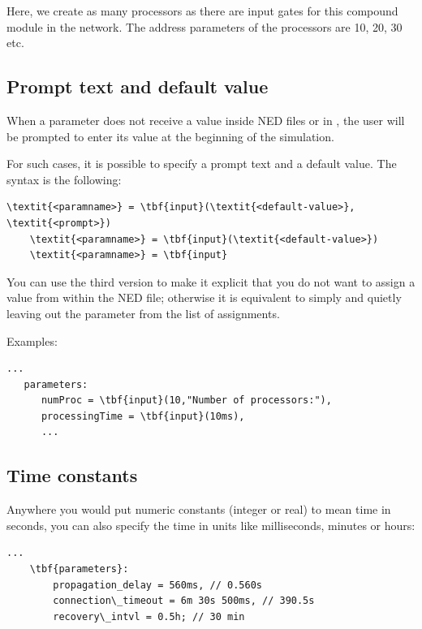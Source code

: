 Here, we create as many processors as there are input gates for
this compound module in the network. The address parameters of
the processors are 10, 20, 30 etc.



\subsection{Prompt text and default value}

When a parameter does not receive a value inside NED files or in ,
the user will be prompted to enter its value at the beginning of the simulation.

For such cases, it is possible to specify a prompt text and a default value.
The syntax is the following:

\begin{Verbatim}[commandchars=\\\{\}]
    \textit{<paramname>} = \tbf{input}(\textit{<default-value>}, \textit{<prompt>})
    \textit{<paramname>} = \tbf{input}(\textit{<default-value>})
    \textit{<paramname>} = \tbf{input}
\end{Verbatim}

You can use the third version to make it explicit that you do not want to
assign a value from within the NED file; otherwise it is equivalent to
simply and quietly leaving out the parameter from the list of assignments.

Examples:

\begin{Verbatim}[commandchars=\\\{\}]
   ...
   parameters:
      numProc = \tbf{input}(10,"Number of processors:"),
      processingTime = \tbf{input}(10ms),
      ...
\end{Verbatim}



\subsection{Time constants}

Anywhere you would put numeric constants
(integer or real) to mean time in seconds, you can also specify the
time in units like milliseconds, minutes or hours:


\begin{Verbatim}[commandchars=\\\{\}]
    ...
    \tbf{parameters}:
        propagation_delay = 560ms, // 0.560s
        connection\_timeout = 6m 30s 500ms, // 390.5s
        recovery\_intvl = 0.5h; // 30 min
\end{Verbatim}



